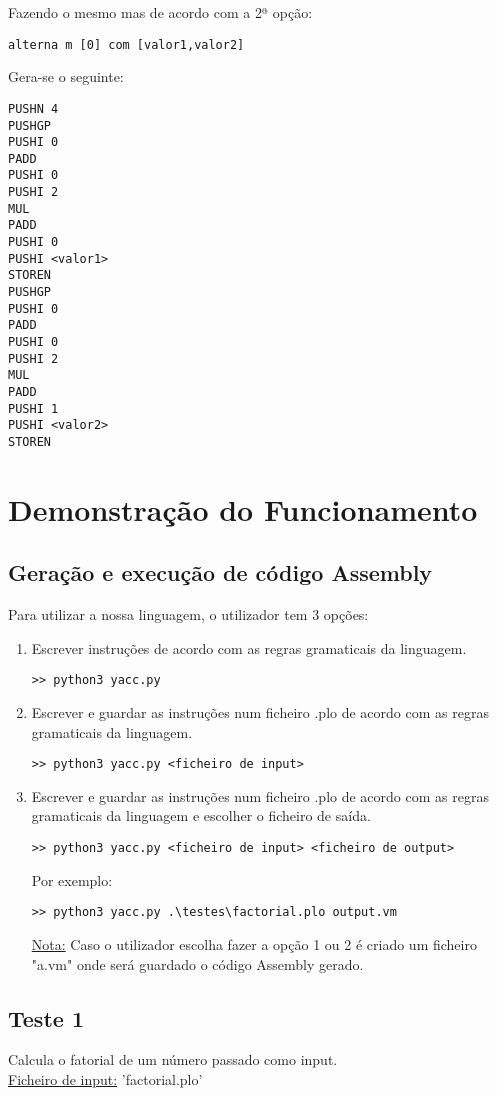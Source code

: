 \documentclass[11pt,a4paper]{report}%
\begin{document}
Fazendo o mesmo mas de acordo com a 2ª opção:
\begin{lstlisting}
alterna m [0] com [valor1,valor2]
\end{lstlisting}
Gera-se o seguinte:
\begin{lstlisting}
PUSHN 4
PUSHGP
PUSHI 0
PADD
PUSHI 0
PUSHI 2
MUL
PADD
PUSHI 0
PUSHI <valor1>
STOREN
PUSHGP
PUSHI 0
PADD
PUSHI 0
PUSHI 2
MUL
PADD
PUSHI 1
PUSHI <valor2>
STOREN
\end{lstlisting}

\chapter{Demonstração do Funcionamento}
\section{Geração e  execução de código Assembly}
Para utilizar a nossa linguagem, o utilizador tem 3 opções:
\begin{enumerate}
\item Escrever instruções de acordo com as regras gramaticais da linguagem.
\begin{verbatim} 
>> python3 yacc.py
\end{verbatim}
\item Escrever e guardar as instruções num ficheiro .plo de acordo com as regras gramaticais da linguagem.
\begin{verbatim} 
>> python3 yacc.py <ficheiro de input> 
\end{verbatim}
\item Escrever e guardar as instruções num ficheiro .plo de acordo com as regras gramaticais da linguagem e escolher o ficheiro de saída.
\begin{verbatim} 
>> python3 yacc.py <ficheiro de input> <ficheiro de output>
\end{verbatim} 

Por exemplo:
\begin{verbatim} 
>> python3 yacc.py .\testes\factorial.plo output.vm
\end{verbatim} 

\underline{Nota:} Caso o utilizador escolha fazer a opção 1 ou 2 é criado um ficheiro "a.vm" onde será guardado o código Assembly gerado.
\end{enumerate}





\section{Teste 1}
Calcula o fatorial de um número passado como input. \\
\underline{Ficheiro de input:} 'factorial.plo'
\end{document}

